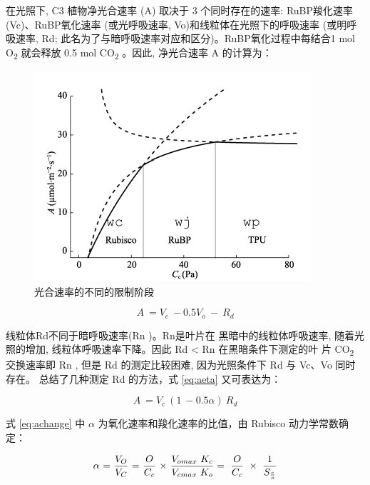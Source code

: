 \documentclass[]{krantz}
\theoremstyle{definition}
\theoremstyle{definition}
\theoremstyle{definition}
\theoremstyle{remark}
\begin{document}
在光照下, C3 植物净光合速率 (A) 取决于 3 个同时存在的速率:
RuBP羧化速率(Vc)、RuBP氧化速率 (或光呼吸速率,
Vo)和线粒体在光照下的呼吸速率 (或明呼吸速率, Rd;
此名为了与暗呼吸速率对应和区分)。RuBP氧化过程中每结合1 mol
O\textsubscript{2} 就会释放 0.5 mol CO\textsubscript{2} 。因此,
净光合速率 A 的计算为：

\begin{figure}
\includegraphics[width=1\linewidth]{images/fvcb} \caption{光合速率的不同的限制阶段}\label{fig:fvcb}
\end{figure}

\begin{equation}
A\ =V_{c}\ -0.5V_{o}\ -\ R_{d}
\label{eq:aeta}
\end{equation}

线粒体Rd不同于暗呼吸速率(Rn )。Rn是叶片在 黑暗中的线粒体呼吸速率,
随着光照的增加, 线粒体呼吸速率下降。因此 Rd \textless{} Rn
在黑暗条件下测定的叶 片 CO\textsubscript{2} 交换速率即 Rn , 但是 Rd
的测定比较困难, 因为光照条件下 Rd 与 Vc、Vo
同时存在。\citet{Hikosaka2006Temperature} 总结了几种测定 Rd 的方法，式
\eqref{eq:aeta} 又可表达为：

\begin{equation}
A\ =V_{c}\ (1\ -0.5\alpha)\ R_{d}
\label{eq:achange}
\end{equation}

式 \eqref{eq:achange} 中 \(\alpha\) 为氧化速率和羧化速率的比值，由 Rubisco
动力学常数确定：

\begin{equation}
\text{\ensuremath{\alpha}\ =\ \ensuremath{\frac{V_{O}}{V_{C}}}\ =\ \ensuremath{\frac{O}{C_{c}}}\ \ensuremath{\times}\ \ensuremath{\frac{V_{omax}\ K_{c}}{V_{cmax}\ K_{o}}}}=\ \frac{O}{C_{c}}\ \times\ \frac{1}{S_{\frac{c}{o}}}
\label{eq:dynamic}
\end{equation}
\end{document}
